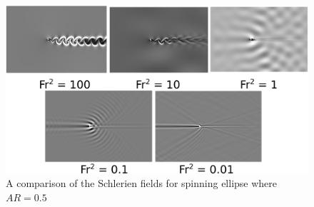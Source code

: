 \begin{figure}
    \centering
    \includegraphics[width=\textwidth]{images/spinning_ellipse/schlerienar0p5.png}
    \caption{A comparison of the Schlerien fields for spinning ellipse where $AR = 0.5$}
    \label{fig:schlerienar0p5}
\end{figure}


\clearpage
